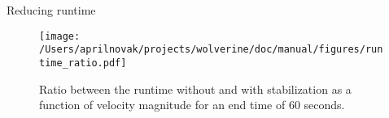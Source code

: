 \documentclass{beamer}
\begin{document}
\begin{frame}{Reducing runtime}
\begin{figure}[H]
  \centering
  \texttt{[image: /Users/aprilnovak/projects/wolverine/doc/manual/figures/runtime\_ratio.pdf]}
  \caption{Ratio between the runtime without and with stabilization as a function of velocity magnitude for an end time of 60 seconds.}
\end{figure}
\end{frame}

\end{document}
